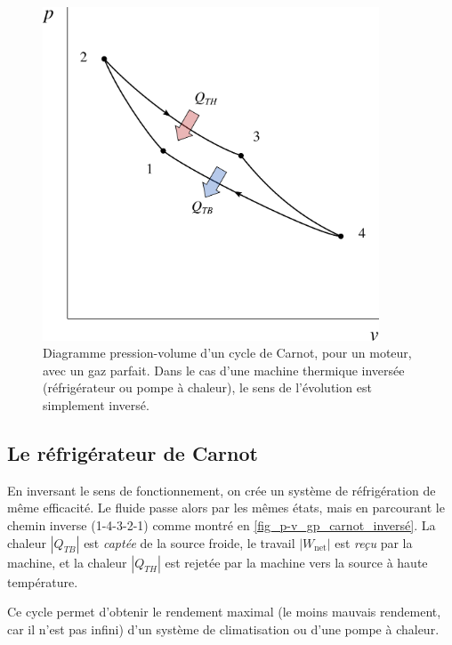 		\begin{figure}[htp] %
			\begin{center}
				\includegraphics[width=10cm]{images/carnot_pv_gp_moteur.png}
			\end{center}
			\caption{Diagramme pression-volume d’un cycle de Carnot, pour un moteur, avec un gaz parfait. Dans le cas d’une machine thermique inversée (réfrigérateur ou pompe à chaleur), le sens de l’évolution est simplement inversé.}
			\label{fig_p-v_gp_carnot}
		\end{figure}



	\subsection{Le réfrigérateur de Carnot}

		En inversant le sens de fonctionnement, on crée un système de réfrigération de même efficacité. Le fluide passe alors par les mêmes états, mais en parcourant le chemin inverse (1-4-3-2-1) comme montré en \cref{fig_p-v_gp_carnot_inversé}. La chaleur $|Q_{TB}|$ est \emph{captée} de la source froide, le travail $|W_\text{net}|$ est \textit{reçu} par la machine, et la chaleur $|Q_{TH}|$ est rejetée par la machine vers la source à haute température.

		Ce cycle permet d’obtenir le rendement maximal (le moins mauvais rendement, car il n’est pas infini) d’un système de climatisation ou d’une pompe à chaleur.

